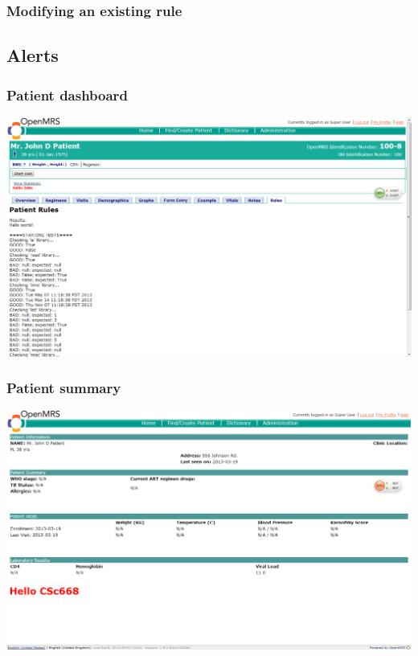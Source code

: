 \documentclass[12pt,letterpaper]{article}
\begin{document}
\subsubsection{Modifying an existing rule}

\subsection{Alerts}

\subsubsection{Patient dashboard}

\includegraphics[width=6.5in]{dashboard2.png}

\subsubsection{Patient summary}

\includegraphics[width=6.5in]{summary.png}
\end{document}
